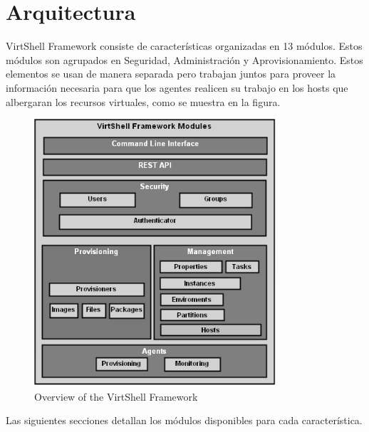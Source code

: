 \begin{description}
\end{description}

\section{Arquitectura}
VirtShell Framework consiste de características organizadas en 13 módulos. Estos módulos son agrupados en Seguridad, Administración y Aprovisionamiento. Estos elementos se usan de manera separada pero trabajan juntos para proveer la información necesaria para que los agentes realicen su trabajo en los hosts que albergaran los recursos virtuales, como se muestra en la figura. \\

\begin{figure}
	\caption{Overview of the VirtShell Framework}
	\includegraphics[width = 0.8\textwidth]{../architecture/v1/diagrams/framework}
\end{figure}

Las siguientes secciones detallan los módulos disponibles para cada característica. 

